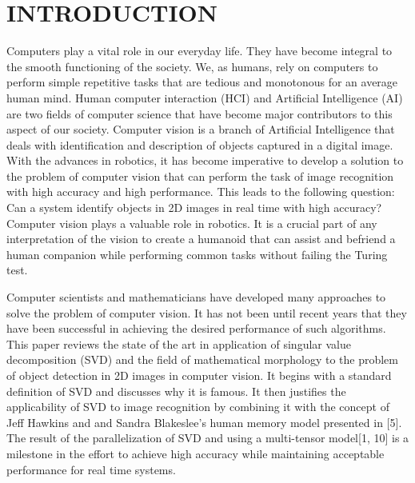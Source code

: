 \documentclass[12pt,a4paper]{article}
\begin{document}
	\tableofcontents
	\thispagestyle{empty}
	\newpage
	
	\clearpage
    \doublespacing
	\section{\large INTRODUCTION}
    \indent \par Computers play a vital role in our everyday life. They have become integral to the smooth functioning of the society. We, as humans, rely on computers to perform simple repetitive tasks that are tedious and monotonous for an average human mind. Human computer interaction (HCI) and Artificial Intelligence (AI) are two fields of computer science that have become major contributors to this aspect of our society. Computer vision is a branch of Artificial Intelligence that deals with identification and description of objects captured in a digital image. With the advances in robotics, it has become imperative to develop a solution to the problem of computer vision that can perform the task of image recognition with high accuracy and high performance. This leads to the following question: Can a system identify objects in 2D images in real time with high accuracy? Computer vision plays a valuable role in robotics. It is a crucial part of any interpretation of the vision to create a humanoid that can assist and befriend a human companion while performing common tasks without failing the Turing test. \par
    Computer scientists and mathematicians have developed many approaches to solve the problem of computer vision. It has not been until recent years that they have been successful in achieving the desired performance of such algorithms. This paper reviews the state of the art in application of singular value decomposition (SVD) and the field of mathematical morphology to the problem of object detection in 2D images in computer vision. It begins with a standard definition of SVD and discusses why it is famous. It then justifies the applicability of SVD to image recognition by combining it with the concept of Jeff Hawkins and and Sandra Blakeslee’s human memory model presented in [5]. The result of the parallelization of SVD and using a multi-tensor model[1, 10] is a milestone in the effort to achieve high accuracy while maintaining acceptable performance for real time systems.
	
\end{document}
